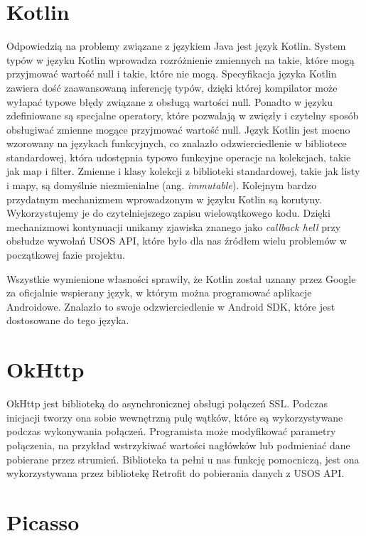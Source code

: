 \documentclass{pracamgr}
\begin{document}
\section{Kotlin}

Odpowiedzią na problemy związane z językiem Java jest język Kotlin. System typów
w języku Kotlin wprowadza rozróżnienie zmiennych na takie, które mogą przyjmować
wartość null i takie, które nie mogą. Specyfikacja języka Kotlin zawiera dość
zaawansowaną inferencję typów, dzięki której kompilator może wyłapać typowe błędy
związane z obsługą wartości null. Ponadto w języku zdefiniowane są specjalne
operatory, które pozwalają w zwięzły i czytelny sposób obsługiwać zmienne mogące
przyjmować wartość null. Język Kotlin jest mocno wzorowany na językach funkcyjnych,
co znalazło odzwierciedlenie w bibliotece standardowej, która udostępnia typowo
funkcyjne operacje na kolekcjach, takie jak map i filter. Zmienne i klasy
kolekcji z biblioteki standardowej, takie jak listy i mapy, są domyślnie niezmienialne
(ang. \textit{immutable}). Kolejnym bardzo przydatnym mechanizmem wprowadzonym w
języku Kotlin są korutyny. Wykorzystujemy je do czytelniejszego zapisu wielowątkowego
kodu. Dzięki mechanizmowi kontynuacji unikamy zjawiska znanego jako \textit{callback hell}
przy obsłudze wywołań USOS API, które było dla nas źródłem wielu problemów w
początkowej fazie projektu.

Wszystkie wymienione własności sprawiły, że Kotlin został uznany przez
Google za oficjalnie wspierany język, w którym można programować aplikacje
Androidowe. Znalazło to swoje odzwierciedlenie w Android SDK, które jest
dostosowane do tego języka.

\section{OkHttp}

OkHttp jest biblioteką do asynchronicznej obsługi połączeń SSL. Podczas inicjacji
tworzy ona sobie wewnętrzną pulę wątków, które są wykorzystywane podczas wykonywania
połączeń. Programista może modyfikować parametry połączenia, na przykład wstrzykiwać
wartości nagłówków lub podmieniać dane pobierane przez strumień. Biblioteka ta
pełni u nas funkcję pomocniczą, jest ona wykorzystywana przez bibliotekę Retrofit
do pobierania danych z USOS API.

\section{Picasso}
\end{document}
